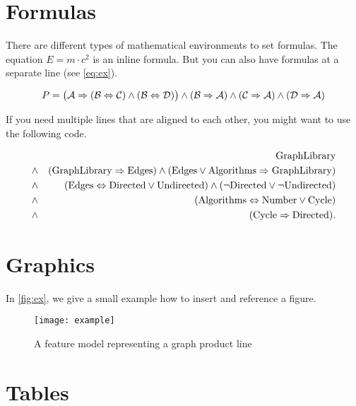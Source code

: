 \section{Formulas}
 
There are different types of mathematical environments to set formulas. The equation $E=m\cdot c^2$ is an inline formula. But you can also have formulas at a separate line (see \vref{eq:ex}).

	\begin{equation}\label{eq:ex}
			P=\bigl(\mathcal{A}\Rightarrow(\mathcal{B}\Leftrightarrow\mathcal{C})\wedge(\mathcal{B}\Leftrightarrow\mathcal{D})\bigr)\wedge(\mathcal{B}\Rightarrow\mathcal{A})\wedge(\mathcal{C}\Rightarrow\mathcal{A})\wedge(\mathcal{D}\Rightarrow\mathcal{A})
	\end{equation}

If you need multiple lines that are aligned to each other, you might want to use the following code.

	\newcommand{\fG}{\mbox{GraphLibrary}}
	\newcommand{\fE}{\mbox{Edges}}
	\newcommand{\fA}{\mbox{Algorithms}}
	\newcommand{\fD}{\mbox{Directed}}
	\newcommand{\fU}{\mbox{Undirected}}
	\newcommand{\fN}{\mbox{Number}}
	\newcommand{\fC}{\mbox{Cycle}}
	\begin{eqnarray*}
	&& \fG\\
	&\pand& (\fG \pimplies \fE) \pand (\fE \por \fA \pimplies \fG)\\
	&\pand& (\fE \pequals \fD \por \fU) \pand (\pnot \fD \por \pnot \fU)\\
	&\pand& (\fA \pequals \fN \por \fC)\\
	&\pand& (\fC \pimplies \fD).\\
	\end{eqnarray*}

\section{Graphics}

In \vref{fig:ex}, we give a small example how to insert and reference a figure.

\begin{figure}[htbp]
	\centering
		\texttt{[image: example]}
	\caption{A feature model representing a graph product line}
	\label{fig:ex}
\end{figure}

\section{Tables}

